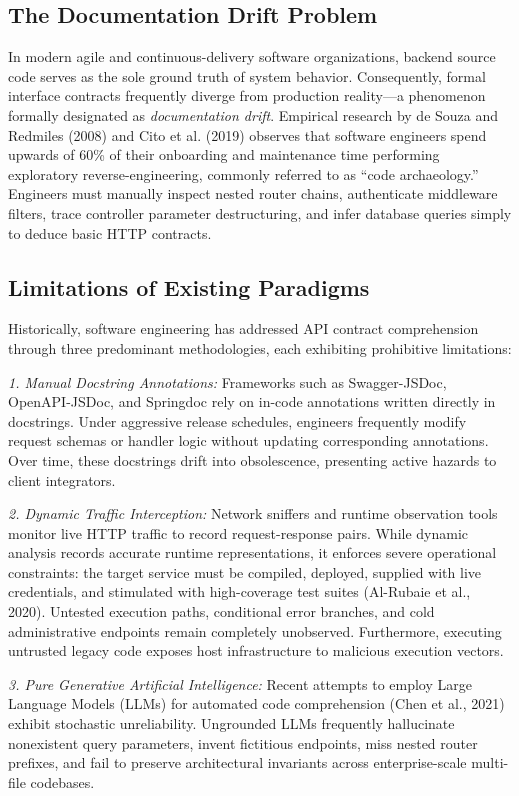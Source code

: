 \documentclass[a4paper,10pt]{article}
\begin{document}
\subsection{The Documentation Drift Problem}
\noindent
In modern agile and continuous-delivery software organizations, backend source code serves as the sole ground truth of system behavior. Consequently, formal interface contracts frequently diverge from production reality---a phenomenon formally designated as \textit{documentation drift}. Empirical research by de Souza and Redmiles (2008) and Cito et al. (2019) observes that software engineers spend upwards of 60\% of their onboarding and maintenance time performing exploratory reverse-engineering, commonly referred to as ``code archaeology.'' Engineers must manually inspect nested router chains, authenticate middleware filters, trace controller parameter destructuring, and infer database queries simply to deduce basic HTTP contracts.

\subsection{Limitations of Existing Paradigms}
\noindent
Historically, software engineering has addressed API contract comprehension through three predominant methodologies, each exhibiting prohibitive limitations:

\textit{1. Manual Docstring Annotations:} Frameworks such as Swagger-JSDoc, OpenAPI-JSDoc, and Springdoc rely on in-code annotations written directly in docstrings. Under aggressive release schedules, engineers frequently modify request schemas or handler logic without updating corresponding annotations. Over time, these docstrings drift into obsolescence, presenting active hazards to client integrators.

\textit{2. Dynamic Traffic Interception:} Network sniffers and runtime observation tools monitor live HTTP traffic to record request-response pairs. While dynamic analysis records accurate runtime representations, it enforces severe operational constraints: the target service must be compiled, deployed, supplied with live credentials, and stimulated with high-coverage test suites (Al-Rubaie et al., 2020). Untested execution paths, conditional error branches, and cold administrative endpoints remain completely unobserved. Furthermore, executing untrusted legacy code exposes host infrastructure to malicious execution vectors.

\textit{3. Pure Generative Artificial Intelligence:} Recent attempts to employ Large Language Models (LLMs) for automated code comprehension (Chen et al., 2021) exhibit stochastic unreliability. Ungrounded LLMs frequently hallucinate nonexistent query parameters, invent fictitious endpoints, miss nested router prefixes, and fail to preserve architectural invariants across enterprise-scale multi-file codebases.
\end{document}
